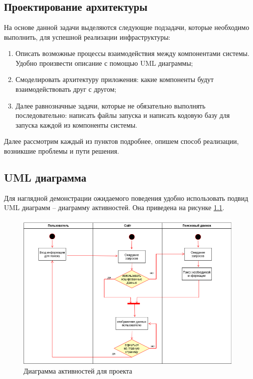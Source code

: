 \chapter{\centering{}}
\label{cha:ch_2}

\section{Проектирование архитектуры}
На основе данной задачи выделяются следующие подзадачи, которые необходимо
выполнить, для успешной реализации инфраструктуры:
\begin{enumerate}[label=\arabic*.]
    \item Описать возможные процессы взаимодействия между компонентами системы.
        Удобно произвести описание с помощью UML диаграммы;
    \item Смоделировать архитектуру приложения: какие компоненты будут
        взаимодействовать друг с другом;
    \item Далее равнозначные задачи, которые не обязательно выполнять
        последовательно: написать файлы запуска и написать кодовую базу для
        запуска каждой из компоненты системы.
\end{enumerate}

Далее рассмотрим каждый из пунктов подробнее, опишем способ реализации,
возникшие проблемы и пути решения.

\section{UML диаграмма}
Для наглядной демонстрации ожидаемого поведения удобно использовать подвид UML
диаграмм -- диаграмму активностей. Она приведена на рисунке \ref{fig:uml-diag}.
\begin{figure}[H]
    \centering
    \includegraphics[scale=0.55]{inc/img/activity_diagram.png}
    \caption{Диаграмма активностей для проекта}
    \label{fig:uml-diag}
\end{figure}

